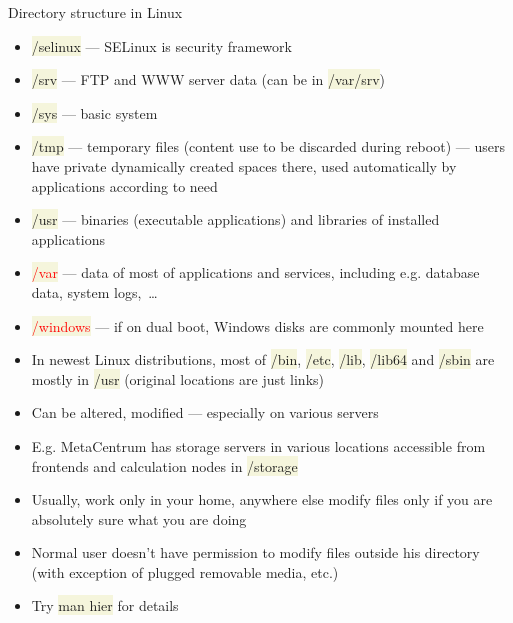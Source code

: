 \documentclass[compress, xelatex, 11pt, xcolor=svgnames, aspectratio=169, url={hyphens, lowtilde}]{beamer}
\renewcommand{\texttt}[1]{\colorbox{Beige}{{\ttfamily #1}}}
\renewcommand{\alert}[1]{\textcolor{red}{#1}}
\begin{document}
\begin{frame}[allowframebreaks]{Directory structure in Linux}
\begin{itemize}
		\item \texttt{/selinux} --- SELinux is security framework
		\item \texttt{/srv} --- FTP and WWW server data (can be in \texttt{/var/srv})
		\item \texttt{/sys} --- basic system
		\item \texttt{/tmp} --- temporary files (content use to be discarded during reboot) --- users have private dynamically created spaces there, used automatically by applications according to need
		\item \texttt{/usr} --- binaries (executable applications) and libraries of installed applications
		\item \alert{\texttt{/var}} --- data of most of applications and services, including e.g. database data, system logs,~\ldots
		\item \alert{\texttt{/windows}} --- if on dual boot, Windows disks are commonly mounted here
		\item In newest Linux distributions, most of \texttt{/bin}, \texttt{/etc}, \texttt{/lib}, \texttt{/lib64} and \texttt{/sbin} are mostly in \texttt{/usr} (original locations are just links)
		\item Can be altered, modified --- especially on various servers
		\item E.g. MetaCentrum has storage servers in various locations accessible from frontends and calculation nodes in \texttt{/storage}
		\item Usually, work only in your home, anywhere else modify files only if you are absolutely sure what you are doing
		\item Normal user doesn't have permission to modify files outside his directory (with exception of plugged removable media, etc.)
		\item Try \texttt{man hier} for details
	\end{itemize}
\end{frame}
\end{document}
